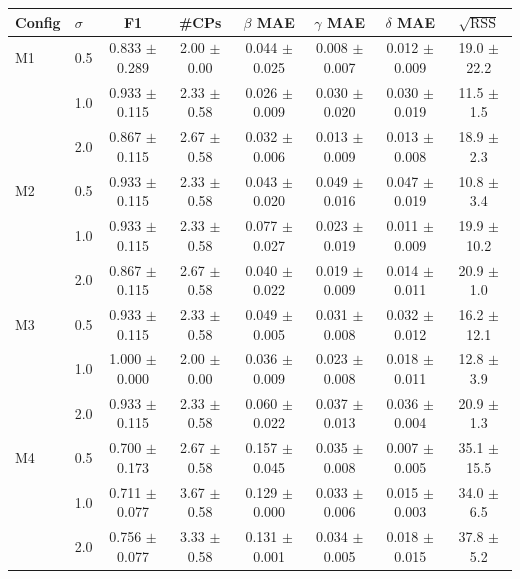 \begin{tabular}{llcccccc}
\hline
Config & $\sigma$ & F1 & \#CPs & $\beta$ MAE & $\gamma$ MAE & $\delta$ MAE & $\sqrt{\mathrm{RSS}}$ \\
\hline
M1 & 0.5 & 0.833 $\pm$ 0.289 & 2.00 $\pm$ 0.00 & 0.044 $\pm$ 0.025 & 0.008 $\pm$ 0.007 & 0.012 $\pm$ 0.009 & 19.0 $\pm$ 22.2 \\
 & 1.0 & 0.933 $\pm$ 0.115 & 2.33 $\pm$ 0.58 & 0.026 $\pm$ 0.009 & 0.030 $\pm$ 0.020 & 0.030 $\pm$ 0.019 & 11.5 $\pm$ 1.5 \\
 & 2.0 & 0.867 $\pm$ 0.115 & 2.67 $\pm$ 0.58 & 0.032 $\pm$ 0.006 & 0.013 $\pm$ 0.009 & 0.013 $\pm$ 0.008 & 18.9 $\pm$ 2.3 \\
\hline
M2 & 0.5 & 0.933 $\pm$ 0.115 & 2.33 $\pm$ 0.58 & 0.043 $\pm$ 0.020 & 0.049 $\pm$ 0.016 & 0.047 $\pm$ 0.019 & 10.8 $\pm$ 3.4 \\
 & 1.0 & 0.933 $\pm$ 0.115 & 2.33 $\pm$ 0.58 & 0.077 $\pm$ 0.027 & 0.023 $\pm$ 0.019 & 0.011 $\pm$ 0.009 & 19.9 $\pm$ 10.2 \\
 & 2.0 & 0.867 $\pm$ 0.115 & 2.67 $\pm$ 0.58 & 0.040 $\pm$ 0.022 & 0.019 $\pm$ 0.009 & 0.014 $\pm$ 0.011 & 20.9 $\pm$ 1.0 \\
\hline
M3 & 0.5 & 0.933 $\pm$ 0.115 & 2.33 $\pm$ 0.58 & 0.049 $\pm$ 0.005 & 0.031 $\pm$ 0.008 & 0.032 $\pm$ 0.012 & 16.2 $\pm$ 12.1 \\
 & 1.0 & 1.000 $\pm$ 0.000 & 2.00 $\pm$ 0.00 & 0.036 $\pm$ 0.009 & 0.023 $\pm$ 0.008 & 0.018 $\pm$ 0.011 & 12.8 $\pm$ 3.9 \\
 & 2.0 & 0.933 $\pm$ 0.115 & 2.33 $\pm$ 0.58 & 0.060 $\pm$ 0.022 & 0.037 $\pm$ 0.013 & 0.036 $\pm$ 0.004 & 20.9 $\pm$ 1.3 \\
\hline
M4 & 0.5 & 0.700 $\pm$ 0.173 & 2.67 $\pm$ 0.58 & 0.157 $\pm$ 0.045 & 0.035 $\pm$ 0.008 & 0.007 $\pm$ 0.005 & 35.1 $\pm$ 15.5 \\
 & 1.0 & 0.711 $\pm$ 0.077 & 3.67 $\pm$ 0.58 & 0.129 $\pm$ 0.000 & 0.033 $\pm$ 0.006 & 0.015 $\pm$ 0.003 & 34.0 $\pm$ 6.5 \\
 & 2.0 & 0.756 $\pm$ 0.077 & 3.33 $\pm$ 0.58 & 0.131 $\pm$ 0.001 & 0.034 $\pm$ 0.005 & 0.018 $\pm$ 0.015 & 37.8 $\pm$ 5.2 \\
\hline
\end{tabular}
